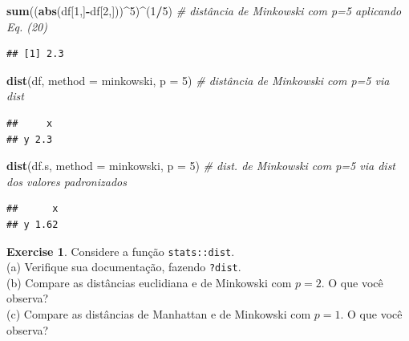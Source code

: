 \documentclass[
]{book}
\newenvironment{Shaded}{\begin{snugshade}}{\end{snugshade}}
\newcommand{\CommentTok}[1]{\textcolor[rgb]{0.56,0.35,0.01}{\textit{#1}}}
\newcommand{\DataTypeTok}[1]{\textcolor[rgb]{0.13,0.29,0.53}{#1}}
\newcommand{\DecValTok}[1]{\textcolor[rgb]{0.00,0.00,0.81}{#1}}
\newcommand{\KeywordTok}[1]{\textcolor[rgb]{0.13,0.29,0.53}{\textbf{#1}}}
\newcommand{\NormalTok}[1]{#1}
\newcommand{\OperatorTok}[1]{\textcolor[rgb]{0.81,0.36,0.00}{\textbf{#1}}}
\newcommand{\StringTok}[1]{\textcolor[rgb]{0.31,0.60,0.02}{#1}}
\theoremstyle{definition}
\theoremstyle{definition}
\theoremstyle{definition}
\newtheorem{exercise}{Exercise}[chapter]
\theoremstyle{remark}
\begin{document}
\begin{Shaded}
\begin{Highlighting}[]
\KeywordTok{sum}\NormalTok{((}\KeywordTok{abs}\NormalTok{(df[}\DecValTok{1}\NormalTok{,]}\OperatorTok{{-}}\NormalTok{df[}\DecValTok{2}\NormalTok{,]))}\OperatorTok{\^{}}\DecValTok{5}\NormalTok{)}\OperatorTok{\^{}}\NormalTok{(}\DecValTok{1}\OperatorTok{/}\DecValTok{5}\NormalTok{)     }\CommentTok{\# distância de Minkowski com p=5 aplicando Eq. (20)}
\end{Highlighting}
\end{Shaded}

\begin{verbatim}
## [1] 2.3
\end{verbatim}

\begin{Shaded}
\begin{Highlighting}[]
\KeywordTok{dist}\NormalTok{(df, }\DataTypeTok{method =} \StringTok{\textquotesingle{}minkowski\textquotesingle{}}\NormalTok{, }\DataTypeTok{p =} \DecValTok{5}\NormalTok{) }\CommentTok{\# distância de Minkowski com p=5 via \textquotesingle{}dist\textquotesingle{}}
\end{Highlighting}
\end{Shaded}

\begin{verbatim}
##     x
## y 2.3
\end{verbatim}

\begin{Shaded}
\begin{Highlighting}[]
\KeywordTok{dist}\NormalTok{(df.s, }\DataTypeTok{method =} \StringTok{\textquotesingle{}minkowski\textquotesingle{}}\NormalTok{, }\DataTypeTok{p =} \DecValTok{5}\NormalTok{) }\CommentTok{\# dist. de Minkowski com p=5 via \textquotesingle{}dist\textquotesingle{} dos valores padronizados}
\end{Highlighting}
\end{Shaded}

\begin{verbatim}
##      x
## y 1.62
\end{verbatim}

\begin{exercise}
\protect\hypertarget{exr:unnamed-chunk-155}{}{\label{exr:unnamed-chunk-155} }Considere a função \texttt{stats::dist}.\\
(a) Verifique sua documentação, fazendo \texttt{?dist}.\\
(b) Compare as distâncias euclidiana e de Minkowski com \(p=2\). O que você observa?\\
(c) Compare as distâncias de Manhattan e de Minkowski com \(p=1\). O que você observa?
\end{exercise}
\end{document}
